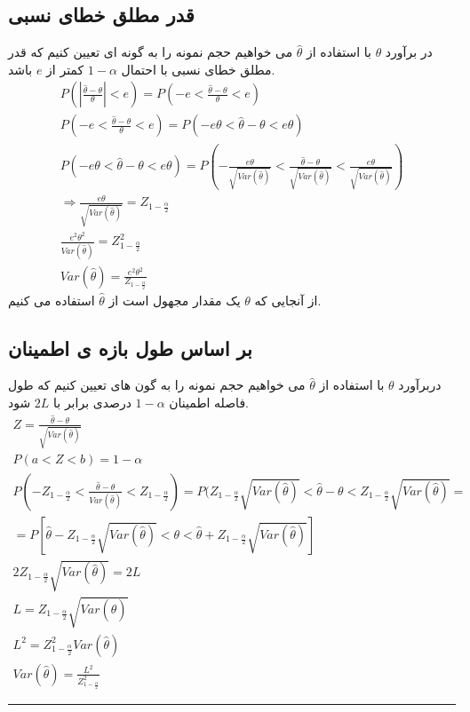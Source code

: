 \subsection{قدر مطلق خطای نسبی}
در برآورد 
$\theta$
با استفاده از 
$\hat{\theta}$
می خواهیم حجم نمونه را به گونه ای تعیین کنیم که قدر مطلق خطای نسبی با احتمال
$1-\alpha$
کمتر از 
$e$
باشد.
\begin{gather*}
	P(|\frac{\hat{\theta}-\theta}{\theta}|<e)=P(-e<\frac{\hat{\theta}-\theta}{\theta}<e) \\
	P(-e<\frac{\hat{\theta}-\theta}{\theta}<e)=P(-e\theta<\hat{\theta}-\theta<e\theta)\\
	P(-e\theta<\hat{\theta}-\theta<e\theta)=
	P(-\frac{e\theta}{\sqrt{Var(\hat{\theta})}}
	<\frac{\hat{\theta}-\theta}{\sqrt{Var(\hat{\theta})}}<
	\frac{e\theta}{\sqrt{Var(\hat{\theta})}})\\
	\Rightarrow \frac{e\theta}{\sqrt{Var(\hat{\theta})}}=Z_{1-\frac{\alpha}{2}} \\
	\frac{e^2\theta^2}{Var(\hat{\theta})}=Z^2_{1-\frac{\alpha}{2}} \\
	Var(\hat{\theta})=\frac{e^2\theta^2}{Z_{1-\frac{\alpha}{2}}} 
\end{gather*}
از آنجایی که 
$\theta$
یک مقدار مجهول است از 
$\hat{\theta}$
استفاده می کنیم.
\subsection*{بر اساس طول بازه ی اطمینان}
دربرآورد 
$\theta$
با استفاده از 
$\hat{\theta}$
می خواهیم حجم نمونه را به گون های تعیین کنیم که طول فاصله اطمینان 
$1-\alpha$
درصدی برابر با
$2L$
شود.
\begin{gather*}
	Z=\frac{\hat{\theta}-\theta}{\sqrt{Var(\hat{\theta})}} \\
	P(a<Z<b)=1-\alpha \\
	P(-Z_{1-\frac{\alpha}{2}}<\frac{\hat{\theta}-\theta}{Var(\hat{\theta})}<Z_{1-\frac{\alpha}{2}})
	=P(Z_{1-\frac{\alpha}{2}}\sqrt{Var(\hat{\theta})}
	<\hat{\theta}-\theta<
	Z_{1-\frac{\alpha}{2}}\sqrt{Var(\hat{\theta})} 
	=\\=
	P[\hat{\theta}-Z_{1-\frac{\alpha}{2}}\sqrt{Var(\hat{\theta})}
	<\theta<
	\hat{\theta}+Z_{1-\frac{\alpha}{2}}\sqrt{Var(\hat{\theta})}] \\
	2Z_{1-\frac{\alpha}{2}}\sqrt{Var(\hat{\theta})}=2L \\
	L=Z_{1-\frac{\alpha}{2}}\sqrt{Var(\hat{\theta})} \\
	L^2=Z^2_{1-\frac{\alpha}{2}}Var(\hat{\theta}) \\
	Var(\hat{\theta})=\frac{L^2}{Z^2_{1-\frac{\alpha}{2}}}
\end{gather*}
\rule{\textwidth}{0.4pt}